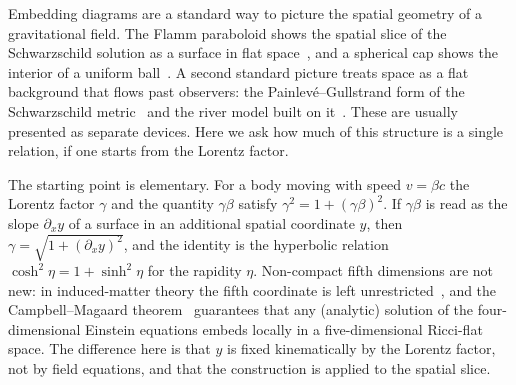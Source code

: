 \documentclass[pdflatex,sn-mathphys-num]{sn-jnl}%
\theoremstyle{thmstyleone}%
\theoremstyle{thmstyletwo}%
\theoremstyle{thmstylethree}%
\begin{document}
Embedding diagrams are a standard way to picture the spatial geometry of a gravitational field. The Flamm paraboloid shows the spatial slice of the Schwarzschild solution as a surface in flat space~\cite{Flamm1916}, and a spherical cap shows the interior of a uniform ball~\cite{Schwarzschild1916}. A second standard picture treats space as a flat background that flows past observers: the Painlev\'e--Gullstrand form of the Schwarzschild metric~\cite{Painleve1921,Gullstrand1922,MartelPoisson2001} and the river model built on it~\cite{HamiltonLisle2008}. These are usually presented as separate devices. Here we ask how much of this structure is a single relation, if one starts from the Lorentz factor.

The starting point is elementary. For a body moving with speed $v=\beta c$ the Lorentz factor $\gamma$ and the quantity $\gamma\beta$ satisfy $\gamma^2=1+(\gamma\beta)^2$. If $\gamma\beta$ is read as the slope $\partial_xy$ of a surface in an additional spatial coordinate $y$, then $\gamma=\sqrt{1+(\partial_xy)^2}$, and the identity is the hyperbolic relation $\cosh^2\eta=1+\sinh^2\eta$ for the rapidity $\eta$. Non-compact fifth dimensions are not new: in induced-matter theory the fifth coordinate is left unrestricted~\cite{Wesson1999,OverduinWesson1997}, and the Campbell--Magaard theorem~\cite{Campbell1926,Magaard1963} guarantees that any (analytic) solution of the four-dimensional Einstein equations embeds locally in a five-dimensional Ricci-flat space. The difference here is that $y$ is fixed kinematically by the Lorentz factor, not by field equations, and that the construction is applied to the spatial slice.
\end{document}
